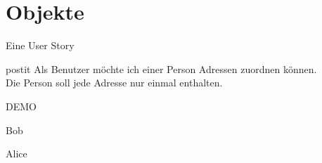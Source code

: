 \part{Objekte}

\begin{frame}{Eine User Story}
\hbox{}\hfill\begin{beamercolorbox}[sep=1em,wd=7cm,shadow=true,rounded=true]{postit} 
Als Benutzer möchte ich einer Person Adressen zuordnen können.\\[1em]
Die Person soll jede Adresse nur einmal enthalten.
\end{beamercolorbox}\hfill\hbox{}
\end{frame}

\begin{frame}{}
\begin{center}
DEMO
\end{center}
\end{frame}



\begin{frame}{Bob}

\end{frame}

\begin{frame}{Alice}

\end{frame}


